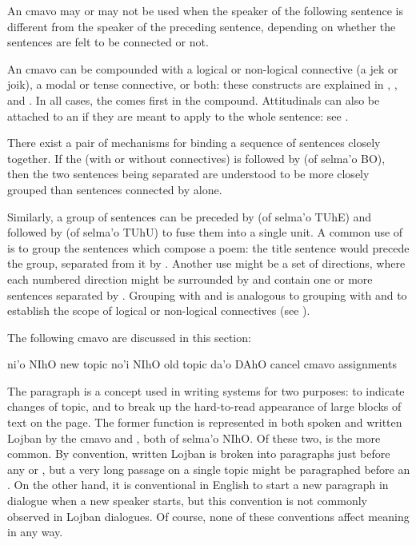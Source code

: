 An  cmavo may or may not be used when the speaker of
    the following sentence is different from the speaker of the
    preceding sentence, depending on whether the sentences are felt
    to be connected or not.

An  cmavo can be compounded with a logical or
    non-logical connective (a jek or joik), a modal or tense
    connective, or both: these constructs are explained in , , and . In all cases,
    the  comes first in the compound. Attitudinals can also
    be attached to an  if they are meant to apply to the
    whole sentence: see .

There exist a pair of mechanisms for binding a sequence of
    sentences closely together. If the  (with or without
    connectives) is followed by  (of selma'o BO), then the
    two sentences being separated are understood to be more closely
    grouped than sentences connected by  alone.

 Similarly, a group of sentences can be preceded by  (of
    selma'o TUhE) and followed by  (of selma'o TUhU) to fuse
    them into a single unit. A common use of  is to
    group the sentences which compose a poem: the title sentence would
    precede the group, separated from it by . Another use might be
    a set of directions, where each numbered direction might be
    surrounded by  and contain one or more sentences
    separated by . Grouping with  and  is
    analogous to grouping with  and  to establish the
    scope of logical or non-logical connectives (see ).



The following cmavo are discussed in this section:

   ni'o    NIhO    new topic
    no'i    NIhO    old topic
    da'o    DAhO    cancel cmavo assignments

The paragraph is a concept used in writing systems for two
    purposes: to indicate changes of topic, and to break up the
    hard-to-read appearance of large blocks of text on the page.
    The former function is represented in both spoken and written
    Lojban by the cmavo  and , both of selma'o
    NIhO. Of these two,  is the more common. By convention,
    written Lojban is broken into paragraphs just before any
     or , but a very long passage on a single topic
    might be paragraphed before an . On the other hand, it is
    conventional in English to start a new paragraph in dialogue
    when a new speaker starts, but this convention is not commonly
    observed in Lojban dialogues. Of course, none of these
    conventions affect meaning in any way.

